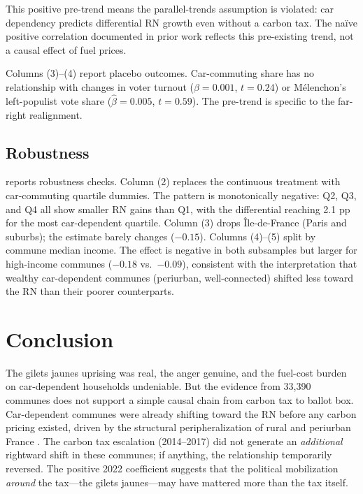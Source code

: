 \documentclass[12pt]{article}
\begin{document}
This positive pre-trend means the parallel-trends assumption is violated: car dependency predicts differential RN growth even without a carbon tax. The na\"{i}ve positive correlation documented in prior work \citep{douenne2022yellow, konradt2024carbon} reflects this pre-existing trend, not a causal effect of fuel prices.

Columns (3)--(4) report placebo outcomes. Car-commuting share has no relationship with changes in voter turnout ($\hat{\beta} = 0.001$, $t = 0.24$) or M\'{e}lenchon's left-populist vote share ($\hat{\beta} = 0.005$, $t = 0.59$). The pre-trend is specific to the far-right realignment.



\subsection{Robustness}

 reports robustness checks. Column (2) replaces the continuous treatment with car-commuting quartile dummies. The pattern is monotonically negative: Q2, Q3, and Q4 all show smaller RN gains than Q1, with the differential reaching 2.1 pp for the most car-dependent quartile. Column (3) drops \^{I}le-de-France (Paris and suburbs); the estimate barely changes ($-0.15$). Columns (4)--(5) split by commune median income. The effect is negative in both subsamples but larger for high-income communes ($-0.18$ vs.~$-0.09$), consistent with the interpretation that wealthy car-dependent communes (periurban, well-connected) shifted less toward the RN than their poorer counterparts.




\section{Conclusion}
\label{sec:conclusion}

The gilets jaunes uprising was real, the anger genuine, and the fuel-cost burden on car-dependent households undeniable. But the evidence from 33,390 communes does not support a simple causal chain from carbon tax to ballot box. Car-dependent communes were already shifting toward the RN before any carbon pricing existed, driven by the structural peripheralization of rural and periurban France \citep{guilluy2014france}. The carbon tax escalation (2014--2017) did not generate an \textit{additional} rightward shift in these communes; if anything, the relationship temporarily reversed. The positive 2022 coefficient suggests that the political mobilization \textit{around} the tax---the gilets jaunes---may have mattered more than the tax itself.
\end{document}
